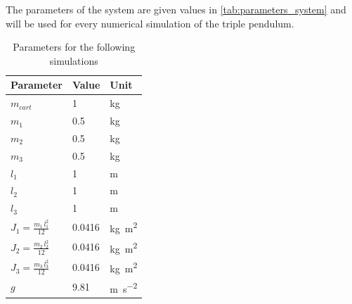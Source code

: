 \documentclass[a4paper,12pt,twoside]{article}
\begin{document}
The parameters of the system are given values in \autoref{tab:parameters_system} and will be used for every numerical simulation of the triple pendulum.
\begin{table}[H]
	\centering
	\caption{Parameters for the following simulations}
	\label{tab:parameters_system}
	\begin{tabular}{@{}lll@{}}
		\toprule
		Parameter                   & Value  & Unit                         \\ \midrule
		$m_{cart}$                  & 1      & kg                           \\
		$m_1$                       & 0.5    & kg                           \\
		$m_2$                       & 0.5    & kg                           \\
		$m_3$                       & 0.5    & kg                           \\
		$l_1$                       & 1      & m                            \\
		$l_2$                       & 1      & m                            \\
		$l_3$                       & 1      & m                            \\
		$J_1=\frac{m_1\,l_1^2}{12}$ & 0.0416 & \si{\kilo\gram\square\metre} \\
		$J_2=\frac{m_2\,l_2^2}{12}$ & 0.0416 & \si{\kilo\gram\square\metre} \\
		$J_3=\frac{m_3\,l_3^2}{12}$ & 0.0416 & \si{\kilo\gram\square\metre} \\
		$g$                         & 9.81   & \si{m\per\square\second}     \\ \bottomrule
	\end{tabular}
\end{table}
\end{document}
